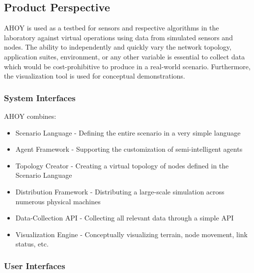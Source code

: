 \documentclass[titlepage]{article}
\begin{document}

\subsection{Product Perspective%
  \label{product-perspective}%
}

AHOY is used as a testbed for sensors and respective algorithms in the laboratory against virtual operations using data from simulated sensors and nodes. The ability to independently and quickly vary the network topology, application suites, environment, or any other variable is essential to collect data which would be cost-prohibitive to produce in a real-world scenario. Furthermore, the visualization tool is used for conceptual demonstrations.


\subsubsection{System Interfaces%
  \label{system-interfaces}%
}

AHOY combines:
\begin{itemize}
    \item Scenario Language - Defining the entire scenario in a very simple language
    \item Agent Framework - Supporting the customization of semi-intelligent agents
    \item Topology Creator - Creating a virtual topology of nodes defined in the Scenario Language
    \item Distribution Framework - Distributing a large-scale simulation across numerous physical machines
    \item Data-Collection API - Collecting all relevant data through a simple API
    \item Visualization Engine - Conceptually visualizing terrain, node movement, link status, etc.
\end{itemize}


\subsubsection{User Interfaces%
  \label{user-interfaces}%
}
\end{document}
